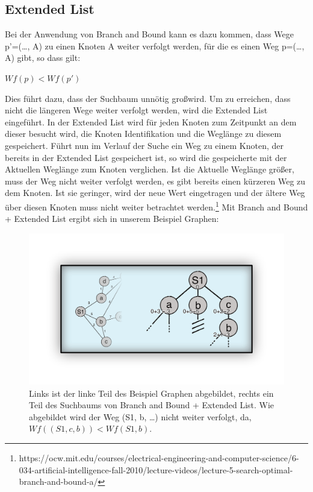 \subsection{Extended List}
Bei der Anwendung von Branch and Bound kann es dazu kommen, dass Wege p'=(\dots, A) zu einen Knoten A weiter verfolgt werden, f\"ur die es einen Weg p=(\dots, A) gibt, so dass gilt:
\begin{center} 
$Wf(p) < Wf(p')$
\end{center}
Dies f\"uhrt dazu, dass der Suchbaum unn\"otig gro\ss wird. Um zu erreichen, dass nicht die l\"angeren Wege weiter verfolgt werden, wird die Extended List eingef\"uhrt. In der Extended List wird f\"ur jeden Knoten zum Zeitpunkt an dem dieser besucht wird, die Knoten Identifikation und die Wegl\"ange zu diesem gespeichert. F\"uhrt nun im Verlauf der Suche ein Weg zu einem Knoten, der bereits in der Extended List gespeichert ist, so wird die gespeicherte mit der Aktuellen Wegl\"ange zum Knoten verglichen. Ist die Aktuelle Wegl\"ange gr\"o\ss er, muss der Weg nicht weiter verfolgt werden, es gibt bereits einen k\"urzeren Weg zu dem Knoten. Ist sie geringer, wird der neue Wert eingetragen und der \"altere Weg \"uber diesen Knoten muss nicht weiter betrachtet werden.\footnote{https://ocw.mit.edu/courses/electrical-engineering-and-computer-science/6-034-artificial-intelligence-fall-2010/lecture-videos/lecture-5-search-optimal-branch-and-bound-a/} Mit Branch and Bound + Extended List ergibt sich in unserem Beispiel Graphen:

\begin{figure}[h!]
	\centering
	\includegraphics[scale=0.4]{chapters/informed_search/ExtendedListBeispiel.png}
	\caption{Links ist der linke Teil des Beispiel Graphen abgebildet, rechts ein Teil des Suchbaums von Branch and Bound + Extended List. Wie abgebildet wird der Weg (S1, b, \dots) nicht weiter verfolgt, da, $Wf((S1, c, b)) < Wf(S1,b)$.}
\end{figure}

